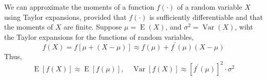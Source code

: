 \begin{remark}
    We can approximate the moments of a function $f(\cdot)$ of a random variable $X$ using Taylor expansions, provided that $f(\cdot)$ is sufficiently differentiable and that the moments of $X$ are finite. Suppose $\mu=\operatorname{E}\left(X\right)$, and $\sigma^{2}=\operatorname{Var}\left(X\right)$, wiht the Taylor expansions for the functions of random variables,
    \begin{equation}
        f\left(X\right)=f\left[\mu+\left(X-\mu\right)\right]\approx f\left(\mu\right)+f^{\prime}\left(\mu\right)\left(X-\mu\right)
    \end{equation}
    Thus,
    \begin{equation}
        \operatorname{E}\left[f\left(X\right)\right]\approx\operatorname{E}\left[f\left(\mu\right)\right],\quad\operatorname{Var}\left[f(X)\right]\approx\left[f^{\prime}\left(\mu\right)\right]^{2}\cdot\sigma^{2}
    \end{equation}

\end{remark}
